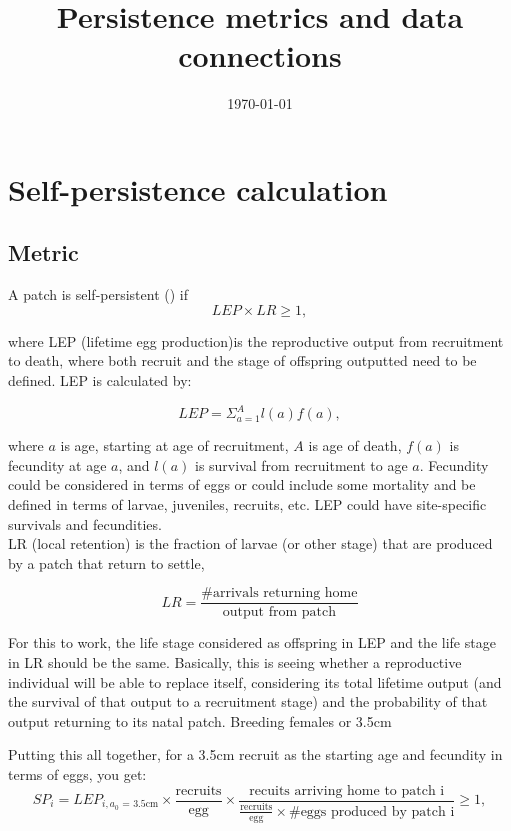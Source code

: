\documentclass[12pt, oneside]{article}   	%
\title{Persistence metrics and data connections}
\begin{document}
\date{\today}
\maketitle{}
\section{Self-persistence calculation}
\subsection*{Metric}
A patch is self-persistent (\cite{burgess2014beyond}) if
\begin{equation}
LEP \times LR \geq 1,
\end{equation}

where LEP (lifetime egg production)is the reproductive output from recruitment to death, where both recruit and the stage of offspring outputted need to be defined. LEP is calculated by:

\begin{equation}
LEP = \Sigma_{a = 1}^{A} l(a)f(a),
\end{equation}{}

where $a$ is age, starting at age of recruitment, $A$ is age of death, $f(a)$ is fecundity at age $a$, and $l(a)$ is survival from recruitment to age $a$. Fecundity could be considered in terms of eggs or could include some mortality and be defined in terms of larvae, juveniles, recruits, etc. LEP could have site-specific survivals and fecundities.\\ %

LR (local retention) is the fraction of larvae (or other stage) that are produced by a patch that return to settle,

\begin{equation}
LR = \frac{\text{\# arrivals returning home}}{\text{output from patch}}
\end{equation}

For this to work, the life stage considered as offspring in LEP and the life stage in LR should be the same. Basically, this is seeing whether a reproductive individual will be able to replace itself, considering its total lifetime output (and the survival of that output to a recruitment stage) and the probability of that output returning to its natal patch. Breeding females or 3.5cm 

Putting this all together, for a 3.5cm recruit as the starting age and fecundity in terms of eggs, you get:
\begin{equation}
SP_i = LEP_{i, \text{$a_0$ = 3.5cm}} \times \frac{\text{recruits}}{\text{egg}} \times \frac{\text{recuits arriving home to patch i}}{\frac{\text{recruits}}{\text{egg}} \times \# \text{eggs produced by patch i}} \geq 1, 
\end{equation}
\end{document}
